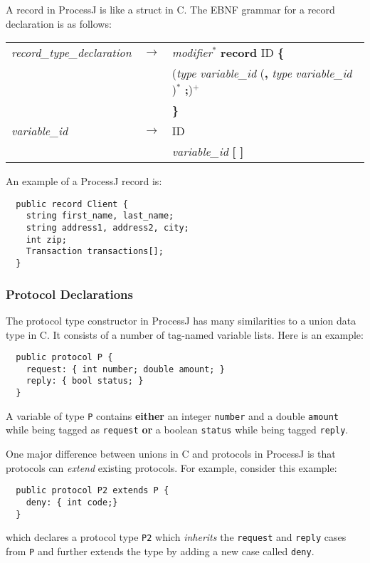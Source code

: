 \documentclass[pdflatex,11pt,letter]{article}
\begin{document}
A record in ProcessJ is like a struct in C. The EBNF grammar for a record declaration is as follows:

\begin{center}
\begin{tabular}{lll}
{\it record\_type\_declaration} & $\rightarrow$ & 
          {\it modifier}$^*$ {\bf record} ID {\bf \{} \\
          && ({\it type} {\it variable\_id} ({\bf ,} {\it type} {\it variable\_id} )$^*$ {\bf ;})$^+$\\
          && {\bf \}}\\
{\it variable\_id} & $\rightarrow$ & ID\\
 && {\it variable\_id} {\bf [ ]}\\
\end{tabular}
\end{center}
An example of a ProcessJ record is:
\begin{verbatim}
  public record Client {
    string first_name, last_name;
    string address1, address2, city;
    int zip;
    Transaction transactions[]; 
  }    
\end{verbatim}


\subsubsection{Protocol Declarations}

The protocol type constructor in ProcessJ has many similarities to a union data type in C. It consists of a number of tag-named variable lists. Here is an example:
\begin{verbatim}
  public protocol P {
    request: { int number; double amount; }
    reply: { bool status; }
  }
\end{verbatim}

A variable of type {\tt P} contains {\bf either} an integer {\tt number} and a double {\tt amount} while being tagged as {\tt request} {\bf or} a boolean {\tt status} while being tagged {\tt reply}. 

One major difference between unions in C and protocols in ProcessJ is that protocols can {\em extend} existing protocols. For example, consider this example:
\begin{verbatim}
  public protocol P2 extends P {
    deny: { int code;}
  }
\end{verbatim}
which declares a protocol type {\tt P2} which {\em inherits} the {\tt request} and {\tt reply} cases from {\tt P} and further extends the type by adding a new case called {\tt deny}.
\end{document}
